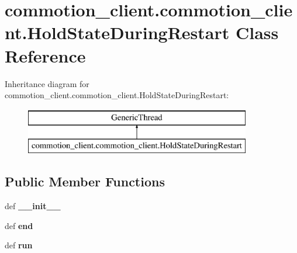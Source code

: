 \hypertarget{classcommotion__client_1_1commotion__client_1_1HoldStateDuringRestart}{\section{commotion\+\_\+client.\+commotion\+\_\+client.\+Hold\+State\+During\+Restart Class Reference}
\label{classcommotion__client_1_1commotion__client_1_1HoldStateDuringRestart}
}
Inheritance diagram for commotion\+\_\+client.\+commotion\+\_\+client.\+Hold\+State\+During\+Restart\+:\begin{figure}[H]
\begin{center}
\leavevmode
\includegraphics[height=2.000000cm]{classcommotion__client_1_1commotion__client_1_1HoldStateDuringRestart}
\end{center}
\end{figure}
\subsection*{Public Member Functions}
\begin{DoxyCompactItemize}
\item 
\hypertarget{classcommotion__client_1_1commotion__client_1_1HoldStateDuringRestart_a94f6059b8470ee3a2307bdc2d08935a4}{def {\bfseries \+\_\+\+\_\+init\+\_\+\+\_\+}}\label{classcommotion__client_1_1commotion__client_1_1HoldStateDuringRestart_a94f6059b8470ee3a2307bdc2d08935a4}

\item 
\hypertarget{classcommotion__client_1_1commotion__client_1_1HoldStateDuringRestart_a8f5151ef8eaea8fbdaa3d52005556ad2}{def {\bfseries end}}\label{classcommotion__client_1_1commotion__client_1_1HoldStateDuringRestart_a8f5151ef8eaea8fbdaa3d52005556ad2}

\item 
\hypertarget{classcommotion__client_1_1commotion__client_1_1HoldStateDuringRestart_a4385fc3adbd39cb53ad032166fac2aef}{def {\bfseries run}}\label{classcommotion__client_1_1commotion__client_1_1HoldStateDuringRestart_a4385fc3adbd39cb53ad032166fac2aef}

\end{DoxyCompactItemize}
